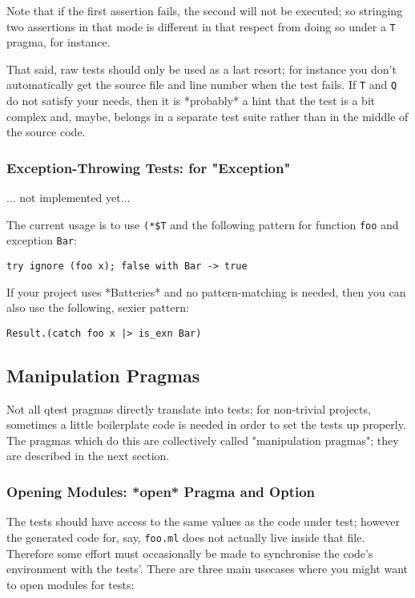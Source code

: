 \documentclass[a4paper,12pt]{article}
\begin{document}
Note that if the first assertion fails, the second will not be executed; so stringing two
assertions in that mode is different in that respect from doing so under a \texttt{T} pragma, for
instance.

That said, raw tests should only be used as a last resort; for instance you don't
automatically get the source file and line number when the test fails. If \texttt{T} and \texttt{Q} do
not satisfy your needs, then it is *probably* a hint that the test is a bit complex and,
maybe, belongs in a separate test suite rather than in the middle of the source code.

\subsubsection{Exception-Throwing Tests:  for "Exception"}

... not implemented yet...

The current usage is to use \texttt{(*\$T} and the following pattern for function \texttt{foo} and
exception \texttt{Bar}:

\begin{verbatim}
try ignore (foo x); false with Bar -> true
\end{verbatim} 

If your project uses *Batteries* and no pattern-matching is needed, then you can also use
the following, sexier pattern:

\begin{verbatim}
Result.(catch foo x |> is_exn Bar)
\end{verbatim} 

\subsection{Manipulation Pragmas}

Not all qtest pragmas directly translate into tests; for non-trivial projects, sometimes a
little boilerplate code is needed in order to set the tests up properly. The pragmas which
do this are collectively called "manipulation pragmas"; they are described in the next
section.

\subsubsection{Opening Modules: *open* Pragma  and  Option}

The tests should have access to the same values as the code under test; however the
generated code for, say, \texttt{foo.ml} does not actually live inside that file. Therefore some
effort must occasionally be made to synchronise the code's environment with the tests'.
There are three main usecases where you might want to open modules for tests:
\end{document}
